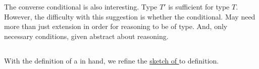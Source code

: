 \begin{note}
  The converse conditional is also interesting.
  Type \(T'\) is sufficient for type \(T\).
  However, the difficulty with this suggestion is whether the conditional.
  May need more than just extension in order for reasoning to be of type.
  And, only necessary conditions, given abstract about reasoning.
\end{note}

\subsection{}
\label{cha:typical:sec:tR:tRDef}

\begin{note}
  With the definition of a \rotor{} in hand, we refine the \hyperref[sketch:tR]{sketch of \tRN{}} to definition.
\end{note}

